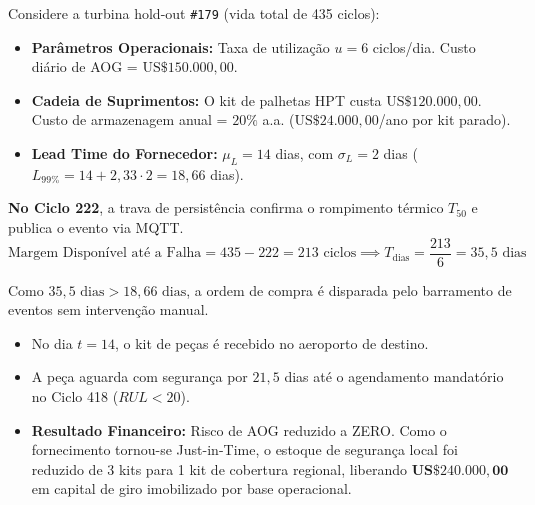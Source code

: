 \begin{examplebox}
Considere a turbina hold-out \texttt{\#179} (vida total de 435 ciclos):
\begin{itemize}
    \item \textbf{Parâmetros Operacionais:} Taxa de utilização $u = 6$ ciclos/dia. Custo diário de AOG = $\text{US\$} 150.000,00$.
    \item \textbf{Cadeia de Suprimentos:} O kit de palhetas HPT custa $\text{US\$} 120.000,00$. Custo de armazenagem anual = $20\%$ a.a. ($\text{US\$} 24.000,00$/ano por kit parado).
    \item \textbf{Lead Time do Fornecedor:} $\mu_L = 14$ dias, com $\sigma_L = 2$ dias ($L_{99\%} = 14 + 2,33 \cdot 2 = 18,66$ dias).
\end{itemize}

\textbf{No Ciclo 222}, a trava de persistência confirma o rompimento térmico $T_{50}$ e publica o evento via MQTT.
$$\text{Margem Disponível até a Falha} = 435 - 222 = 213\text{ ciclos} \implies T_{\text{dias}} = \frac{213}{6} = 35,5\text{ dias}$$

Como $35,5\text{ dias} > 18,66\text{ dias}$, a ordem de compra é disparada pelo barramento de eventos sem intervenção manual.
\begin{itemize}
    \item No dia $t = 14$, o kit de peças é recebido no aeroporto de destino.
    \item A peça aguarda com segurança por $21,5$ dias até o agendamento mandatório no Ciclo 418 ($RUL < 20$).
    \item \textbf{Resultado Financeiro:} Risco de AOG reduzido a ZERO. Como o fornecimento tornou-se Just-in-Time, o estoque de segurança local foi reduzido de 3 kits para 1 kit de cobertura regional, liberando $\mathbf{\text{US\$} 240.000,00}$ em capital de giro imobilizado por base operacional.
\end{itemize}

\end{examplebox}

